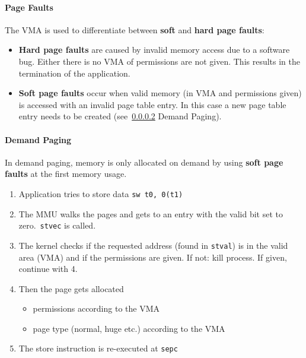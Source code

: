 \paragraph{Page Faults}
The VMA is used to differentiate between \textbf{soft} and \textbf{hard page faults}:
\begin{itemize}
    \item \textbf{Hard page faults} are caused by invalid memory access due to a software bug. Either there is no VMA of permissions are not given. This results in the termination of the application.
    \item \textbf{Soft page faults} occur when valid memory (in VMA and permissions given) is accessed with an invalid page table entry. In this case a new page table entry needs to be created (see~\ref{page demanding} Demand Paging).
\end{itemize}



\paragraph{Demand Paging}\label{page demanding}
In demand paging, memory is only allocated on demand by using \textbf{soft page faults} at the first memory usage.

\newpar{}

\begin{enumerate}
    \item Application tries to store data
          \texttt{sw t0, 0(t1)}
    \item The MMU walks the pages and gets to an entry with the valid bit set to zero.~\texttt{stvec} is called.
    \item The kernel checks if the requested address (found in \texttt{stval}) is in the valid area (VMA) and if the permissions are given. If not: kill process. If given, continue with 4.
    \item Then the page gets allocated
          \begin{itemize}
              \item permissions according to the VMA
              \item page type (normal, huge etc.) according to the VMA
          \end{itemize}
    \item The store instruction is re-executed at \texttt{sepc}
\end{enumerate}

\newpar{}

